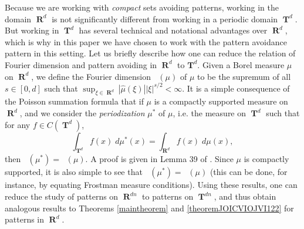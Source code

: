 \documentclass[12pt,reqno]{article}
\numberwithin{equation}{section}
\DeclareMathOperator{\hausdim}{\dim_{\mathbf{H}}}
\DeclareMathOperator{\fordim}{\dim_{\mathbf{F}}}
\DeclareMathOperator{\RR}{\mathbf{R}}
\DeclareMathOperator{\TT}{\mathbf{T}}
\numberwithin{theorem}{section}
\begin{document}
Because we are working with \emph{compact} sets avoiding patterns, working in the domain $\RR^d$ is not significantly different from working in a periodic domain $\TT^d$. But working in $\TT^d$ has several technical and notational advantages over $\RR^d$, which is why in this paper we have chosen to work with the pattern avoidance pattern in this setting. Let us briefly describe how one can reduce the relation of Fourier dimension and pattern avoiding in $\RR^d$ to $\mathbf{T}^d$. Given a Borel measure $\mu$ on $\RR^d$, we define the Fourier dimension $\fordim(\mu)$ of $\mu$ to be the supremum of all $s \in [0,d]$ such that $\sup_{\xi \in \RR^d} |\widehat{\mu}(\xi)| |\xi|^{s/2} < \infty$. It is a simple consequence of the Poisson summation formula that if $\mu$ is a compactly supported measure on $\RR^d$, and we consider the  \emph{periodization} $\mu^*$ of $\mu$, i.e. the measure on $\TT^d$ such that for any $f \in C(\TT^d)$,
%
\begin{equation}
    \int_{\TT^d} f(x)\; d\mu^*(x) = \int_{\RR^d} f(x)\; d\mu(x),
\end{equation}
%
then $\fordim(\mu^*) = \fordim(\mu)$. A proof is given in Lemma 39 of \cite{myThesis}. Since $\mu$ is compactly supported, it is also simple to see that $\hausdim(\mu^*) = \hausdim(\mu)$ (this can be done, for instance, by equating Frostman measure conditions). Using these results, one can reduce the study of patterns on $\RR^{dn}$ to patterns on $\TT^{dn}$, and thus obtain analogous results to Theorems \ref{maintheorem} and \ref{theoremJOICVIOJVI122} for patterns in $\RR^d$.

\begin{comment}
It is expected that Theorem \ref{theoremJOICVIOJVI122} is tight for general patterns $Z$. If $E$ is Salem and has dimension $d/(n-1)$, then $f(E^n)$ is a subset of $\TT^{d(n-1)}$ with nonempty interior, because
%
\begin{align*}
    \int e^{-2 \pi i \xi \cdot y} df_*(\mu^{\otimes})(y) &= \int e^{-2 \pi i \xi \cdot f(x)} d\mu(x_1) \dots d\mu(x_n)\\
    &= \lim_{k \to \infty} \int e^{-2 \pi i \xi \cdot f(x)} \phi^{\otimes}_k(x) dx\\
    &= \lim_{k \to \infty} \int e^{-2 \pi i \xi \cdot (x_1 + \dots + x_n)} \det(D_{x_1} f) \phi_k(g(z,x_2,\dots,x_n)) \phi_k^{\otimes}(x)\; dx
\end{align*}
%
where $f(g(z,x_2,\dots,x_n),x_2,\dots,x_n) = z$.
On the other hand, for patterns with richer structure this result is certainly non-optimal. For instance, in BLAH a Salem set in $\RR$ of dimension one is constructed avoiding solutions to the equation $x_3 = 2x_2 - x_1$; our techniques only guarantee the existence of a Salem set of dimension $1/2$.
\end{comment}
\end{document}
